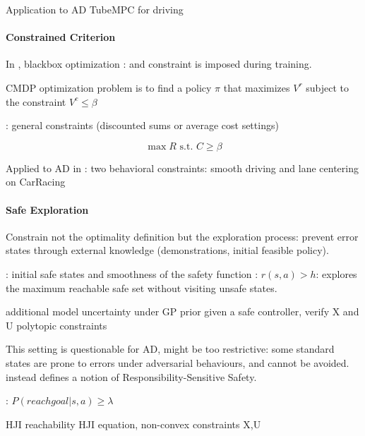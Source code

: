 Application to AD
\citep{Williams2018} TubeMPC for driving

\paragraph{Constrained Criterion}

In \citep{Berkenkamp2016}, blackbox optimization : and constraint is imposed during training.

CMDP optimization problem is to find a policy $\pi$ that maximizes $V^r$ subject to the constraint $V^c \leq \beta$

\citep{Altman1999,Achiam2017}

\citep{Tessler2019}: general constraints (discounted sums or average cost settings)

$$\max R \text{ s.t. } C \geq \beta$$

Applied to AD in \citep{Le2019}: two behavioral constraints: smooth driving and lane centering on CarRacing


\paragraph{Safe Exploration}

Constrain not the optimality definition but the exploration process: prevent error states through external knowledge (demonstrations, initial feasible policy).

\citep{Turchetta2016}: initial safe states and smoothness of the safety function : $r(s,a) > h$: explores the maximum reachable safe set without visiting unsafe states.

\citep{Koller2019}
additional model uncertainty under GP prior
given a safe controller, verify X and U polytopic constraints


This setting is questionable for AD, might be too restrictive: some standard states are prone to errors under adversarial behaviours, and cannot be avoided.
\citep{ShalevShwartz2017} instead defines a notion of Responsibility-Sensitive Safety.

\citep{Bouton2019}
\citep{Bouton2019workshop}: $P(reach goal |s, a) \geq \lambda$

\citep{leung2018infusing} HJI reachability
\citep{Fisac2019} HJI equation, non-convex constraints X,U
